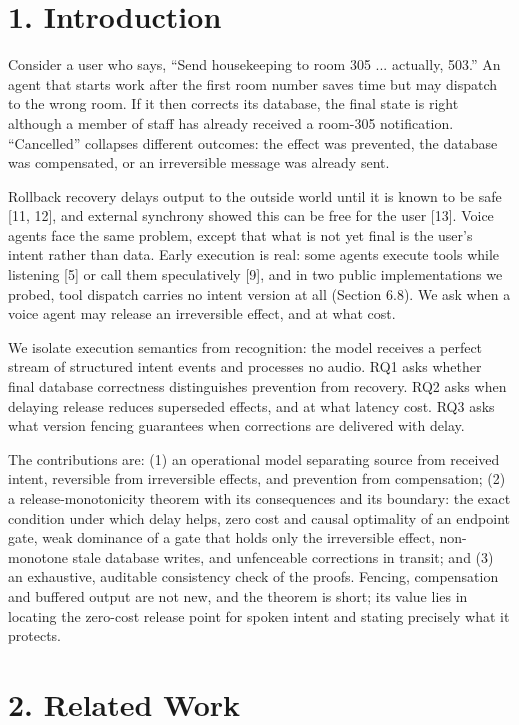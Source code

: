 \documentclass[review,12pt]{elsarticle}
\begin{document}
\section*{1. Introduction}

Consider a user who says, ``Send housekeeping to room 305 ... actually, 503.'' An agent that starts work after the first room number saves time but may dispatch to the wrong room. If it then corrects its database, the final state is right although a member of staff has already received a room-305 notification. ``Cancelled'' collapses different outcomes: the effect was prevented, the database was compensated, or an irreversible message was already sent.


Rollback recovery delays output to the outside world until it is known to be safe [11, 12], and external synchrony showed this can be free for the user [13]. Voice agents face the same problem, except that what is not yet final is the user's intent rather than data. Early execution is real: some agents execute tools while listening [5] or call them speculatively [9], and in two public implementations we probed, tool dispatch carries no intent version at all (Section 6.8). We ask when a voice agent may release an irreversible effect, and at what cost.


We isolate execution semantics from recognition: the model receives a perfect stream of structured intent events and processes no audio. RQ1 asks whether final database correctness distinguishes prevention from recovery. RQ2 asks when delaying release reduces superseded effects, and at what latency cost. RQ3 asks what version fencing guarantees when corrections are delivered with delay.


The contributions are: (1) an operational model separating source from received intent, reversible from irreversible effects, and prevention from compensation; (2) a release-monotonicity theorem with its consequences and its boundary: the exact condition under which delay helps, zero cost and causal optimality of an endpoint gate, weak dominance of a gate that holds only the irreversible effect, non-monotone stale database writes, and unfenceable corrections in transit; and (3) an exhaustive, auditable consistency check of the proofs. Fencing, compensation and buffered output are not new, and the theorem is short; its value lies in locating the zero-cost release point for spoken intent and stating precisely what it protects.


\section*{2. Related Work}
\end{document}
